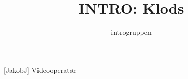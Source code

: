 \documentclass[a4paper,11pt]{article}
\title{INTRO: Klods}
\author{introgruppen}
\begin{document}
\maketitle

\begin{roles}
[JakobJ] Videooperatør
\end{roles}

\begin{props}
\end{props}

\begin{sketch}

\end{sketch}
\end{document}
